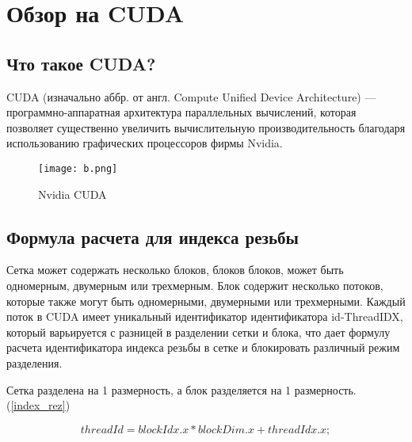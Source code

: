 \documentclass[a4paper, 12pt]{report}
\begin{document}

    \chapter{Обзор на CUDA}
    \section{Что такое CUDA?}
	
    CUDA (изначально аббр. от англ. Compute Unified Device Architecture) — программно-аппаратная архитектура параллельных вычислений, которая позволяет существенно увеличить вычислительную производительность благодаря использованию графических процессоров фирмы Nvidia. \cite{sanders2010cuda}
    \begin{figure}[h!]
	\centering
	\texttt{[image: b.png]}
	\caption{Nvidia CUDA}
	\label{}
    \end{figure}
    \section{Формула расчета для индекса резьбы}
    Сетка может содержать несколько блоков, блоков блоков, может быть одномерным, двумерным или трехмерным. Блок содержит несколько потоков, которые также могут быть одномерными, двумерными или трехмерными.
    Каждый поток в CUDA имеет уникальный идентификатор идентификатора id-ThreadIDX, который варьируется с разницей в разделении сетки и блока, что дает формулу расчета идентификатора индекса резьбы в сетке и блокировать различный режим разделения. \cite{garland2008parallel}
    
    Сетка разделена на 1 размерность, а блок разделяется на 1 размерность.(\ref{index_rez})

    \begin{equation}
       	threadId = blockIdx.x *blockDim.x + threadIdx.x;  		
        \label{index_rez}
    \end{equation}

    \printbibliography

 
\end{document}
